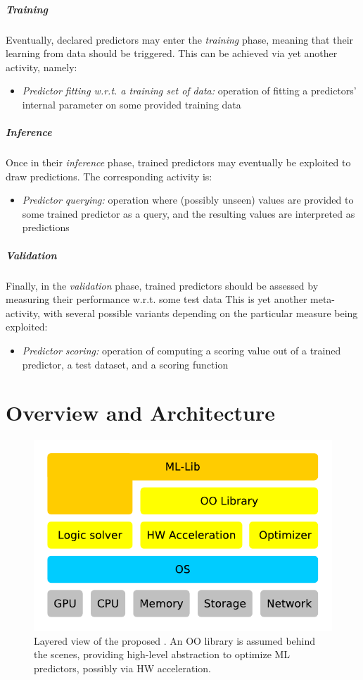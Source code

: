 \documentclass[
]{ceurart}
\begin{document}
\subparagraph{Training}
%
Eventually, declared predictors may enter the \emph{training} phase, meaning that their learning from data should be triggered.
%
This can be achieved via yet another activity, namely:
\begin{itemize}
    \item \emph{Predictor fitting w.r.t. a training set of data:} operation of fitting a predictors' internal parameter on some provided training data
\end{itemize}

\subparagraph{Inference}
%
Once in their \emph{inference} phase, trained predictors may eventually be exploited to draw predictions.
The corresponding activity is:
\begin{itemize}
    \item \emph{Predictor querying:} operation where (possibly unseen) values are provided to some trained predictor as a query, and the resulting values are interpreted as predictions
\end{itemize}

\subparagraph{Validation}
%
Finally, in the \emph{validation} phase, trained predictors should be assessed by measuring their performance w.r.t. some test data
%
This is yet another meta-activity, with several possible variants depending on the particular measure being exploited:
%
\begin{itemize}
    \item \emph{Predictor scoring:} operation of computing a scoring value out of a trained predictor, a test dataset, and a scoring function
\end{itemize}


\section{\mllib{} Overview and Architecture}

\begin{figure}[t]
    \centering
    \includegraphics[width=.5\linewidth]{figures/layers.pdf}
    \caption{Layered view of the proposed \mllib{}. An OO library is assumed behind the scenes, providing high-level abstraction to optimize ML predictors, possibly via HW acceleration.}
    \label{fig:layers}
\end{figure}
\end{document}

